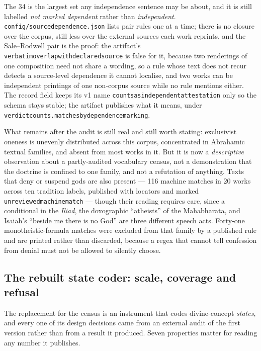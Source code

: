 \documentclass[11pt]{article}
\DeclareRobustCommand{\_}{\textunderscore\allowbreak}
\newcommand{\field}[1]{\texttt{\small #1}}
\begin{document}
The 34 is the largest set any independence sentence may be about, and it is still
labelled \emph{not marked dependent} rather than \emph{independent}.
\texttt{config/source\_dependence.json} lists pair rules one at a time; there is no
closure over the corpus, still less over the external sources each work reprints, and
the Sale--Rodwell pair is the proof: the artifact's
\texttt{verbatim\_overlap\_with\_declared\_source} is false for it, because two
renderings of one composition need not share a wording, so a rule whose text does not
recur detects a source-level dependence it cannot localise, and two works can be
independent printings of one non-corpus source while no rule mentions either. The
record field keeps its v1 name \texttt{counts\_as\_independent\_attestation} only so
the schema stays stable; the artifact publishes what it means, under
\texttt{verdict\_counts.matches\_by\_dependence\_marking}.

What remains after the audit is still real and still worth stating: exclusivist
oneness is unevenly distributed across this corpus, concentrated in Abrahamic
textual families, and absent from most works in it. But it is now a
\emph{descriptive} observation about a partly-audited vocabulary census, not a
demonstration that the doctrine is confined to one family, and not a refutation of
anything. Texts that deny or suspend gods are also present --- 116 machine matches
in 20 works across ten tradition labels, published with locators and marked
\field{unreviewed\_machine\_match} --- though their reading requires care, since a
conditional in the \emph{Iliad}, the doxographic ``atheists'' of the Mahabharata,
and Isaiah's ``beside me there is no God'' are three different speech acts.
Forty-one monotheistic-formula matches were excluded from that family by a
published rule and are printed rather than discarded, because a regex that cannot
tell confession from denial must not be allowed to silently choose.

\subsection{The rebuilt state coder: scale, coverage and refusal}
\label{sec:coder}

The replacement for the census is an instrument that codes divine-concept
\emph{states}, and every one of its design decisions came from an external audit
of the first version rather than from a result it produced. Seven properties
matter for reading any number it publishes.
\end{document}
